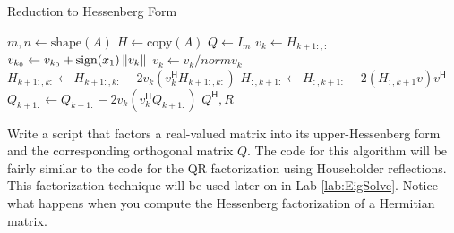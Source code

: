 \begin{algorithm}
\caption{Reduction to Hessenberg Form}
\label{Alg:Hessenberg}
\begin{algorithmic}[1]
\State $m, n \gets \text{shape}(A)$
\State $H \gets \text{copy}(A)$
\State $Q \gets I_m$
    \State $v_k \gets H_{k+1:, :}$
    \State $v_{k_0} \gets v_{k_0} + \text{sign}(x_1) \left\lVert v_k\right\rVert$
    \State $v_k \gets v_k/norm{v_k}$
    \State $H_{k+1:,k:} \gets H_{k+1:,k:} - 2v_k(v_k^\mathsf{H} H_{k+1:,k:})$
    \State $H_{:,k+1:} \gets H_{:,k+1:} - 2(H_{:,k+1} v) v^\mathsf{H}$
    \State $Q_{k+1:} \gets Q_{k+1:} - 2v_k(v_k^\mathsf{H} Q_{k+1:})$
\EndFor
\State {} $Q^\mathsf{H}, R$
\EndProcedure
\end{algorithmic}
\end{algorithm}

\begin{problem}
Write a script that factors a real-valued matrix into its upper-Hessenberg form and the corresponding orthogonal matrix $Q$.
The code for this algorithm will be fairly similar to the code for the QR factorization using Householder reflections.
This factorization technique will be used later on in Lab \ref{lab:EigSolve}.
Notice what happens when you compute the Hessenberg factorization of a Hermitian matrix.
\end{problem}

